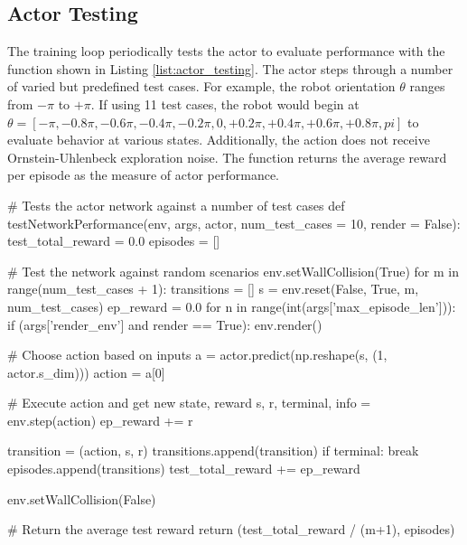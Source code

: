 \subsection{Actor Testing}
The training loop periodically tests the actor to evaluate performance with the  function shown in Listing \ref{list:actor_testing}. The actor steps through a number of varied but predefined test cases. For example, the robot orientation $\theta$ ranges from $-\pi$ to $+\pi$. If using 11 test cases, the robot would begin at $\theta=[-\pi, -0.8\pi, -0.6\pi, -0.4\pi, -0.2\pi, 0, +0.2\pi, +0.4\pi, +0.6\pi, +0.8\pi, pi]$ to evaluate behavior at various states. Additionally, the action does not receive Ornstein-Uhlenbeck exploration noise. The function returns the average reward per episode as the measure of actor performance.
\begin{python}[caption={Actor Testing Function},label={list:actor_testing}]
# Tests the actor network against a number of test cases
def testNetworkPerformance(env, args, actor, num_test_cases = 10, render = False):
    test_total_reward = 0.0
    episodes = []

    # Test the network against random scenarios
    env.setWallCollision(True)
    for m in range(num_test_cases + 1):
        transitions = []
        s = env.reset(False, True, m, num_test_cases)
        ep_reward = 0.0
        for n in range(int(args['max_episode_len'])):
            if (args['render_env'] and render == True):
                env.render()

            # Choose action based on inputs
            a = actor.predict(np.reshape(s, (1, actor.s_dim)))
            action = a[0]

            # Execute action and get new state, reward
            s, r, terminal, info = env.step(action)
            ep_reward += r

            transition = (action, s, r)
            transitions.append(transition)
            if terminal:
                break
        episodes.append(transitions)
        test_total_reward += ep_reward

    env.setWallCollision(False)

    # Return the average test reward
    return (test_total_reward / (m+1), episodes)

\end{python}
%


